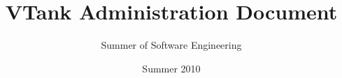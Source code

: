 \documentclass{report}
\begin{document}
\title{VTank Administration Document}
\author{Summer of Software Engineering}
\date{Summer 2010}
\maketitle


\tableofcontents
\newpage
{}









\end{document}
